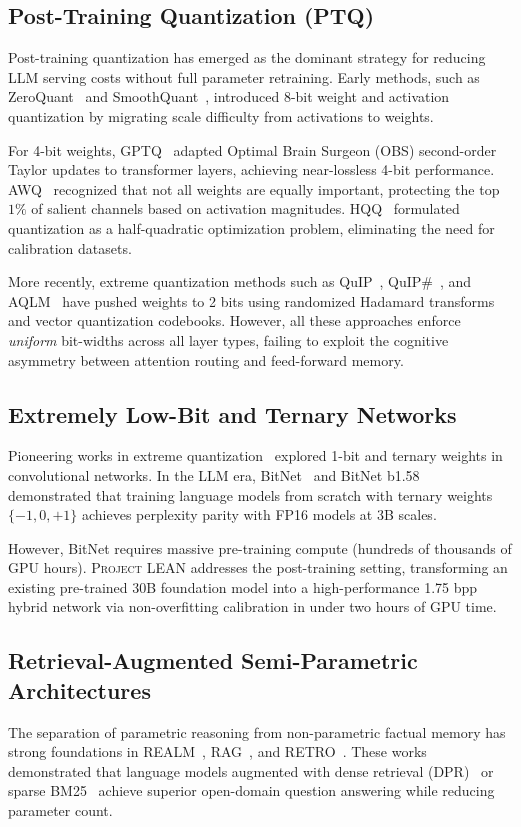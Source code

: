 \documentclass[10pt,twocolumn,letterpaper]{article}
\newcommand{\systemname}{\textsc{Project LEAN}}
\begin{document}
\subsection{Post-Training Quantization (PTQ)}
Post-training quantization has emerged as the dominant strategy for reducing LLM serving costs without full parameter retraining. Early methods, such as ZeroQuant~\cite{dettmers2022llm8bit} and SmoothQuant~\cite{xiao2023smoothquant}, introduced 8-bit weight and activation quantization by migrating scale difficulty from activations to weights. 

For 4-bit weights, GPTQ~\cite{frantar2022gptq} adapted Optimal Brain Surgeon (OBS) second-order Taylor updates to transformer layers, achieving near-lossless 4-bit performance. AWQ~\cite{lin2023awq} recognized that not all weights are equally important, protecting the top $1\%$ of salient channels based on activation magnitudes. HQQ~\cite{badri2023hqq} formulated quantization as a half-quadratic optimization problem, eliminating the need for calibration datasets. 

More recently, extreme quantization methods such as QuIP~\cite{chee2024quip}, QuIP\#~\cite{tseng2024quipsharp}, and AQLM~\cite{egiazarian2024aqlm} have pushed weights to 2 bits using randomized Hadamard transforms and vector quantization codebooks. However, all these approaches enforce \textit{uniform} bit-widths across all layer types, failing to exploit the cognitive asymmetry between attention routing and feed-forward memory.

\subsection{Extremely Low-Bit and Ternary Networks}
Pioneering works in extreme quantization~\cite{hubara2016binarized,li2016ternary} explored 1-bit and ternary weights in convolutional networks. In the LLM era, BitNet~\cite{wang2024bitnet} and BitNet b1.58~\cite{ma2024bitnetb158} demonstrated that training language models from scratch with ternary weights $\{-1, 0, +1\}$ achieves perplexity parity with FP16 models at 3B scales. 

However, BitNet requires massive pre-training compute (hundreds of thousands of GPU hours). \systemname{} addresses the post-training setting, transforming an existing pre-trained 30B foundation model into a high-performance 1.75 bpp hybrid network via non-overfitting calibration in under two hours of GPU time.

\subsection{Retrieval-Augmented Semi-Parametric Architectures}
The separation of parametric reasoning from non-parametric factual memory has strong foundations in REALM~\cite{guu2020realm}, RAG~\cite{lewis2020rag}, and RETRO~\cite{borgeaud2022retro}. These works demonstrated that language models augmented with dense retrieval (DPR)~\cite{karpukhin2020dpr} or sparse BM25~\cite{robertson2009bm25} achieve superior open-domain question answering while reducing parameter count. 
\end{document}
